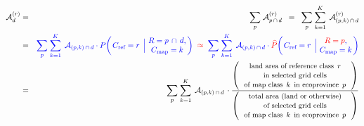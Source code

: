


\begin{eqnarray*}
\mathcal{A}^{(r)}_{d}
	& = &
	\underset{p}{\sum}\;
	\mathcal{A}^{(r)}_{p\,\cap\,d}
\;\; = \;\;
	\underset{p}{\sum}\;
	\overset{K}{\underset{k=1}{\sum}}\;\,
	\mathcal{A}^{(r)}_{(p,k)\,\cap\,d}
\\
	& = &
	{\color{blue}
	\underset{p}{\sum}\;
	\overset{K}{\underset{k=1}{\sum}}\;\,
	\mathcal{A}_{(p,k)\,\cap\,d}
	\cdot
	P\!\left(
		\left. C_{\textnormal{ref}} \overset{{\color{white}1}}{=} r \,\;\right\vert\!\!
		\begin{array}{c} R = p\,\cap\,d, \\ C_{\textnormal{map}} = k \end{array}
		\!\!\right)}
\;\; {\color{red}\approx} \;\;
	{\color{blue}
	\underset{p}{\sum}\;
	\overset{K}{\underset{k=1}{\sum}}\;\,
	\mathcal{A}_{(p,k)\,\cap\,d}
	\cdot
	{\color{red}\widehat{P}}\!\left(
		\left. C_{\textnormal{ref}} \overset{{\color{white}1}}{=} r \,\;\right\vert\!\!
		\begin{array}{c} {\color{red}R = p}, \\ C_{\textnormal{map}} = k \end{array}
		\!\!\right)}
\\
& = &
	\underset{p}{\sum}\;
	\overset{K}{\underset{k=1}{\sum}}\;\,
	\mathcal{A}_{(p,k)\,\cap\,d}
	\,\cdot
	\dfrac{
		\left(\,\begin{array}{c}
			\textnormal{\small land area of reference class \,$r$}
			\\
			\textnormal{\small in selected grid cells}
			\\
			\textnormal{\small of map class \,$k$\, in ecoprovince \,$p$}
			\end{array}\,\right)
		}{
		\left(\,\begin{array}{c}
			\textnormal{\small total area (land or otherwise)}
			\\
			\textnormal{\small of selected grid cells}
			\\
			\textnormal{\small of map class \,$k$\, in ecoprovince \,$p$}
			\end{array}\,\right)
		}

\end{eqnarray*}
